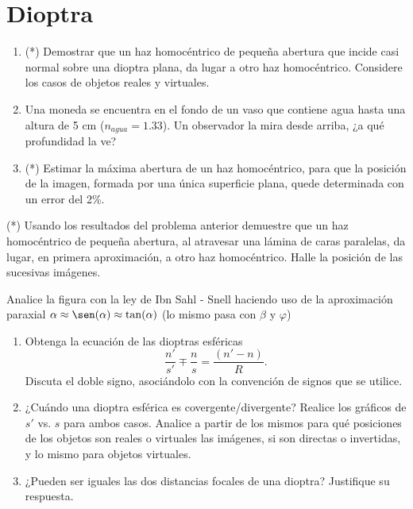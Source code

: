 \section*{Dioptra}

\item 
\begin{enumerate}
	\item (*) Demostrar que un haz homocéntrico de pequeña abertura que incide casi normal sobre una dioptra plana, da lugar a otro haz homocéntrico.
	Considere los casos de objetos reales y virtuales.
	\item Una moneda se encuentra en el fondo de un vaso que contiene agua hasta una altura de 5 cm ($n_{agua}=1.33$).
	Un observador la mira desde arriba, ¿a qué profundidad la ve?
	\item (*) Estimar la máxima abertura de un haz homocéntrico, para que la posición de la imagen, formada por una única superficie plana, quede determinada con un error del 2\%. 
\end{enumerate}


\item (*) Usando los resultados del problema anterior demuestre que un haz homocéntrico de pequeña abertura, al atravesar una lámina de caras paralelas, da lugar, en primera aproximación, a otro haz homocéntrico.
Halle la posición de las sucesivas imágenes. 


\item
\begin{minipage}[t][1.4cm]{0.52\textwidth}
	Analice la figura con la ley de Ibn Sahl - Snell haciendo uso de la aproximación paraxial $\alpha \approx \sen( \alpha ) \approx \tan( \alpha )$ (lo mismo pasa con $\beta$ y $\varphi$) 
\end{minipage}
\begin{minipage}[c][0.4cm][t]{0.4\textwidth}
	
\end{minipage}
\begin{enumerate}
	\item
	Obtenga la ecuación de las dioptras esféricas
	\[
		\frac{n'}{s'}\mp\frac{n}{s}=\frac{(n'-n)}{R} .
	\]
	Discuta el doble signo, asociándolo con la convención de signos que se utilice.
	\item ¿Cuándo una dioptra esférica es covergente/divergente? 
	Realice los gráficos de $s'$ vs. $s$ para ambos casos.
	Analice a partir de los mismos para qué posiciones de los objetos son reales o virtuales las imágenes, si son directas o invertidas, y lo mismo para objetos virtuales.
	\item ¿Pueden ser iguales las dos distancias focales de una dioptra?
	Justifique su respuesta.
\end{enumerate}
